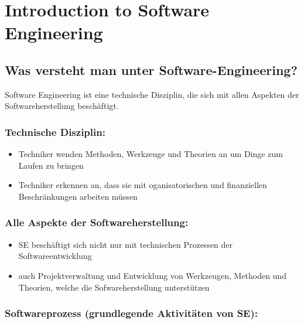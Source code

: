 \chapter{Introduction to Software Engineering}
\section{Was versteht man unter Software-Engineering?}
Software Engineering ist eine technische Disziplin, die sich mit allen Aspekten der Softwareherstellung beschäftigt.
\subsection{Technische Disziplin:}
\begin{itemize}
    \item Techniker wenden Methoden, Werkzeuge und Theorien an um Dinge zum Laufen zu bringen
    \item Techniker erkennen an, dass sie mit oganisatorischen und finanziellen Beschränkungen arbeiten müssen
\end{itemize}
\subsection{Alle Aspekte der Softwareherstellung:}
\begin{itemize}
    \item SE beschäftigt sich nicht nur mit technischen Prozessen der Softwareentwicklung
    \item auch Projektverwaltung und Entwicklung von Werkzeugen, Methoden und Theorien, welche die Sofwareherstellung unterstützen
\end{itemize}
\subsection{Softwareprozess (grundlegende Aktivitäten von SE):}
